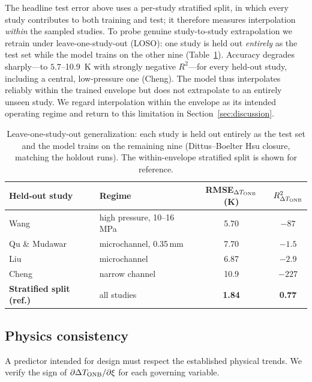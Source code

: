 The headline test error above uses a per-study stratified split, in which every
study contributes to both training and test; it therefore measures interpolation
\emph{within} the sampled studies. To probe genuine
study-to-study extrapolation we retrain under leave-one-study-out (LOSO): one
study is held out \emph{entirely} as the test set while the model trains on the
other nine (Table~\ref{tab:loso}). Accuracy degrades sharply---to
$5.7$--\SI{10.9}{K} with strongly negative $R^2$---for every held-out study,
including a central, low-pressure one (Cheng). The model thus interpolates
reliably within the trained envelope but does not extrapolate to an entirely
unseen study. We regard interpolation within the envelope as its intended
operating regime and return to this limitation in
Section~\ref{sec:discussion}.

\begin{table}[t]
\centering
\caption{Leave-one-study-out generalization: each study is held out entirely as
the test set and the model trains on the remaining nine (Dittus--Boelter Hsu
closure, matching the holdout runs). The within-envelope stratified split is
shown for reference.}
\label{tab:loso}
\small
\begin{tabular}{llcc}
\toprule
Held-out study & Regime & RMSE$_{\Delta T_{\mathrm{ONB}}}$ (K) & $R^2_{\Delta T_{\mathrm{ONB}}}$ \\
\midrule
Wang \cite{WANG2024}          & high pressure, 10--16\,MPa & 5.70  & $-87$ \\
Qu \& Mudawar \cite{QUMUDAWAR2002} & microchannel, 0.35\,mm     & 7.70  & $-1.5$ \\
Liu \cite{LIU2005}            & microchannel               & 6.87  & $-2.9$ \\
Cheng \cite{CHENG2022}        & narrow channel             & 10.9  & $-227$ \\
\midrule
\textbf{Stratified split (ref.)} & all studies            & \textbf{1.84} & \textbf{0.77} \\
\bottomrule
\end{tabular}
\end{table}

\subsection{Physics consistency}
\label{sec:physcon}

A predictor intended for design must respect the established physical trends.
We verify the sign of $\partial\Delta T_{\mathrm{ONB}}/\partial\xi$ for each governing variable.

